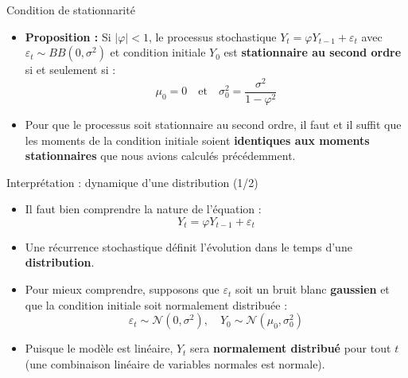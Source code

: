 \documentclass[11pt,aspectratio=169]{beamer}
\begin{document}
\begin{frame}{Condition de stationnarité}

\begin{itemize}

\item \textbf{Proposition :} Si $|\varphi| < 1$, le processus stochastique $Y_t = \varphi Y_{t-1} + \varepsilon_t$ avec $\varepsilon_t \sim BB(0, \sigma^2)$ et condition initiale $Y_0$ est \textbf{stationnaire au second ordre} si et seulement si :
\[
\mu_0 = 0 \quad \text{et} \quad \sigma_0^2 = \frac{\sigma^2}{1 - \varphi^2}
\]

\item Pour que le processus soit stationnaire au second ordre, il faut et il suffit que les moments de la condition initiale soient \textbf{identiques aux moments stationnaires} que nous avions calculés précédemment.

\end{itemize}
\end{frame}

\begin{frame}{Interprétation : dynamique d'une distribution (1/2)}

\begin{itemize}

\item Il faut bien comprendre la nature de l'équation :
\[
Y_t = \varphi Y_{t-1} + \varepsilon_t
\]

\item Une récurrence stochastique définit l'évolution dans le temps d'une \textbf{distribution}.\newline

\item Pour mieux comprendre, supposons que $\varepsilon_t$ soit un bruit blanc \textbf{gaussien} et que la condition initiale soit normalement distribuée :
\[
\varepsilon_t \sim \mathcal{N}(0, \sigma^2), \quad Y_0 \sim \mathcal{N}(\mu_0, \sigma_0^2)
\]

\item Puisque le modèle est linéaire, $Y_t$ sera \textbf{normalement distribué} pour tout $t$ (une combinaison linéaire de variables normales est normale).

\end{itemize}
\end{frame}
\end{document}
